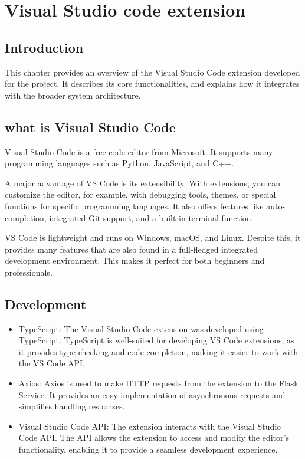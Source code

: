 \chapter{Visual Studio code extension}
\label{chap:VS_code_extension}

\section{Introduction}

This chapter provides an overview of the Visual Studio Code extension developed for the project. It describes its core functionalities, and explains how it integrates with the broader system architecture.

\section{what is Visual Studio Code}

Visual Studio Code is a free code editor from Microsoft. It supports many programming languages such as Python, JavaScript, and C++.

A major advantage of VS Code is its extensibility. With extensions, you can customize the editor, for example, with debugging tools, themes, or special functions for specific programming languages. It also offers features like auto-completion, integrated Git support, and a built-in terminal function.

VS Code is lightweight and runs on Windows, macOS, and Linux. Despite this, it provides many features that are also found in a full-fledged integrated development environment. This makes it perfect for both beginners and professionals.

\section{Development}

\begin{itemize}
    \item TypeScript: The Visual Studio Code extension was developed using TypeScript. TypeScript is well-suited for developing VS Code extensions, as it provides type checking and code completion, making it easier to work with the VS Code API.
    \item Axios: Axios is used to make HTTP requests from the extension to the Flask Service. It provides an easy implementation of asynchronous requests and simplifies handling responses.
    \item Visual Studio Code API: The extension interacts with the Visual Studio Code API. The API allows the extension to access and modify the editor's functionality, enabling it to provide a seamless development experience.
\end{itemize}

